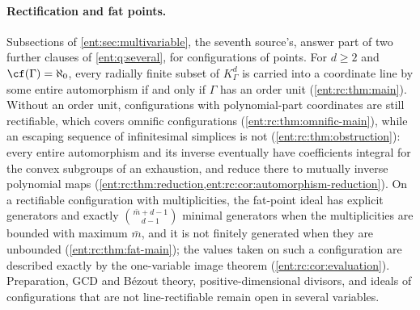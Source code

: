 \documentclass[11pt]{article}
\theoremstyle{plain}
\theoremstyle{plain}
\theoremstyle{plain}
\theoremstyle{definition}
\theoremstyle{definition}
\theoremstyle{definition}
\theoremstyle{definition}
\theoremstyle{remark}
\newcommand{\K}{K_\Gamma}\newcommand{\KD}{K_\Delta}
\begin{document}
\paragraph{Rectification and fat points.}
Subsections  of
\cref{ent:sec:multivariable}, the seventh source's, answer part of two further clauses of \cref{ent:q:several}, for
configurations of points. For $d\ge2$ and $\cf(\Gamma)=\aleph_0$, every
radially finite subset of $\K^d$ is carried into a coordinate line by some
entire automorphism if and only if $\Gamma$ has an order unit
(\cref{ent:rc:thm:main}). Without an order unit, configurations with
polynomial-part coordinates are still rectifiable, which covers omnific
configurations (\cref{ent:rc:thm:omnific-main}), while an escaping sequence
of infinitesimal simplices is not (\cref{ent:rc:thm:obstruction}): every
entire automorphism and its inverse eventually have coefficients integral for
the convex subgroups of an exhaustion, and reduce there to mutually inverse
polynomial maps (\cref{ent:rc:thm:reduction,ent:rc:cor:automorphism-reduction}).
On a rectifiable configuration with multiplicities, the fat-point ideal has
explicit generators and exactly $\binom{\bar m+d-1}{d-1}$ minimal generators
when the multiplicities are bounded with maximum $\bar m$, and it is not
finitely generated when they are unbounded (\cref{ent:rc:thm:fat-main}); the
values taken on such a configuration are described exactly by the
one-variable image theorem (\cref{ent:rc:cor:evaluation}). Preparation, GCD
and B\'ezout theory, positive-dimensional divisors, and ideals of
configurations that are not line-rectifiable remain open in several
variables.
\end{document}
